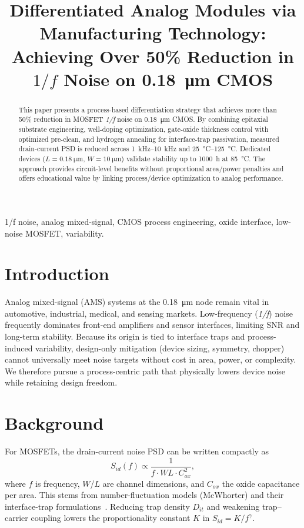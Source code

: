 \documentclass[conference]{IEEEtran}
\title{Differentiated Analog Modules via Manufacturing Technology:\\
Achieving Over 50\% Reduction in $1/f$ Noise on
\texorpdfstring{\SI{0.18}{\um}}{0.18 um} CMOS}
\author{
\IEEEauthorblockN{Shinichi Samizo}
\IEEEauthorblockA{Independent Semiconductor Researcher\\
Project Design Hub, Samizo--AITL\\
\textit{Email:} \href{mailto:shin3t72@gmail.com}{shin3t72@gmail.com}\quad
\textit{GitHub:} \href{https://github.com/Samizo-AITL}{Samizo-AITL}}
}
\begin{document}
\maketitle

\begin{abstract}
This paper presents a process-based differentiation strategy that achieves more than 50\% reduction in MOSFET \emph{1/f} noise on \SI{0.18}{\micro\meter} CMOS. By combining epitaxial substrate engineering, well-doping optimization, gate-oxide thickness control with optimized pre-clean, and hydrogen annealing for interface-trap passivation, measured drain-current PSD is reduced across \SIrange{1}{10}{\kilo\hertz} and \SIrange{25}{125}{\celsius}. Dedicated devices ($L=\SI{0.18}{\micro\meter}$, $W=\SI{10}{\micro\meter}$) validate stability up to 1000~h at \SI{85}{\celsius}. The approach provides circuit-level benefits without proportional area/power penalties and offers educational value by linking process/device optimization to analog performance.
\end{abstract}

\begin{IEEEkeywords}
1/f noise, analog mixed-signal, CMOS process engineering, oxide interface, low-noise MOSFET, variability.
\end{IEEEkeywords}

\section{Introduction}
Analog mixed-signal (AMS) systems at the \SI{0.18}{\micro\meter} node remain vital in automotive, industrial, medical, and sensing markets. Low-frequency (\emph{1/f}) noise frequently dominates front-end amplifiers and sensor interfaces, limiting SNR and long-term stability. Because its origin is tied to interface traps and process-induced variability, design-only mitigation (device sizing, symmetry, chopper) cannot universally meet noise targets without cost in area, power, or complexity. We therefore pursue a process-centric path that physically lowers device noise while retaining design freedom.

\section{Background}
For MOSFETs, the drain-current noise PSD can be written compactly as
\begin{equation}
  S_{id}(f) \propto \frac{1}{f \cdot W L \cdot C_{ox}^{2}},
\end{equation}
where $f$ is frequency, $W$/$L$ are channel dimensions, and $C_{ox}$ the oxide capacitance per area. This stems from number-fluctuation models (McWhorter) and their interface-trap formulations~\cite{Takeda,Ghibaudo}. Reducing trap density $D_{it}$ and weakening trap--carrier coupling lowers the proportionality constant $K$ in $S_{id}=K/f^{\gamma}$.
\end{document}
